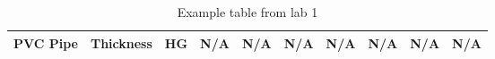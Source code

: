 \begin{table}[h!]
{\begin{tabular}{|l|l|cccc|c|c|c|c|}
			\multirow{-9}{*}{PVC Pipe}        & \multirow{-3}{*}{Thickness}      & \multicolumn{1}{c|}{HG}                & \multicolumn{1}{c|}{\cellcolor[HTML]{FF0000}N/A} & \multicolumn{1}{c|}{\cellcolor[HTML]{FF0000}N/A} & \cellcolor[HTML]{FF0000}N/A & \cellcolor[HTML]{FF0000}N/A & \cellcolor[HTML]{FF0000}N/A & \cellcolor[HTML]{FF0000}N/A & \cellcolor[HTML]{FF0000}N/A \\ \hline
		\end{tabular}%
	}
	\caption{Example table from lab 1}
	\label{tab:my-table}
\end{table}
